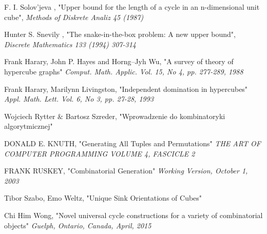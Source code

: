 \documentclass{pracamgr}
\begin{document}
\begin{thebibliography}{99}
  F. I. Solov'jeva ,
   "Upper bound for the length of a cycle in an n-dimensional unit cube",
   \textit{Methods of Diskrete Analiz 45 (1987)}

  Hunter S. Snevily ,
   "The snake-in-the-box problem: A new upper bound",
   \textit{Discrete Mathematics 133 (1994) 307-314}
   
   
   
   Frank Harary, John P. Hayes and Horng--Jyh Wu,
   "A survey of theory of hypercube graphs"
   \textit{Comput. Math. Applic. Vol. 15, No 4, pp. 277-289, 1988}
   
   Frank Harary, Marilynn Livingston,
   "Independent domination in hypercubes"
   \textit{Appl. Math. Lett. Vol. 6, No 3, pp. 27-28, 1993}
   
   Wojciech Rytter $\&$ Bartosz Szreder,
   "Wprowadzenie do kombinatoryki algorytmicznej"
   
   DONALD E. KNUTH,
   "Generating All Tuples and Permutations"
   \textit{THE ART OF COMPUTER PROGRAMMING VOLUME 4, FASCICLE 2}
  
   FRANK RUSKEY,
   "Combinatorial Generation"
   \textit{Working Version, October 1, 2003}

   Tibor Szabo, Emo Weltz,
   "Unique Sink Orientations of Cubes"
   
   Chi Him Wong,
   "Novel universal cycle constructions for a variety of combinatorial objects"
   \textit{Guelph, Ontario, Canada, April, 2015}
   
\end{thebibliography}
\end{document}

